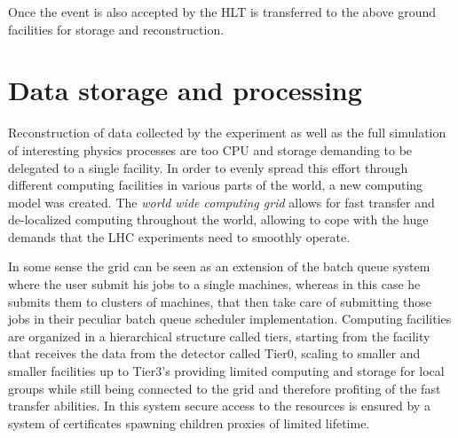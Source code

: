 Once the event is also accepted by the HLT is transferred to the above ground facilities for storage and reconstruction.

\section{Data storage and processing}

Reconstruction of data collected by the experiment as well as the full simulation of interesting physics processes are too CPU and storage demanding to be delegated to a single facility. In order to evenly spread this effort through different computing facilities in various parts of the world, a new computing model was created. The \emph{world wide computing grid} allows for fast transfer and de-localized computing throughout the world, allowing to cope with the huge demands that the LHC experiments need to smoothly operate. 

In some sense the grid can be seen as an extension of the batch queue system where the user submit his jobs to a single machines, whereas in this case he submits them to clusters of machines, that then take care of submitting those jobs in their peculiar batch queue scheduler implementation. Computing facilities are organized in a hierarchical structure called tiers, starting from the facility that receives the data from the detector called Tier0, scaling to smaller and smaller facilities up to Tier3's providing limited computing and storage for local groups while still being connected to the grid and therefore profiting of the fast transfer abilities. In this system secure access to the resources is ensured by a system of certificates spawning children proxies of limited lifetime.

